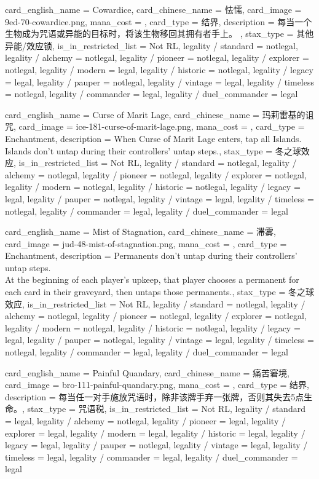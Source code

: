 \documentclass[lang = cn, color = black, 10pt]{AllThatStax}
\begin{document}
\card
{
	card_english_name = {Cowardice},
	card_chinese_name = {怯懦},
	card_image = 9ed-70-cowardice.png,
	mana_cost = ,
	card_type = 结界,
	description = {每当一个生物成为咒语或异能的目标时，将该生物移回其拥有者手上。 },
	stax_type = 其他异能/效应锁,
	is_in_restricted_list = Not RL,
	legality / standard = notlegal,
	legality / alchemy = notlegal,
	legality / pioneer = notlegal,
	legality / explorer = notlegal,
	legality / modern = legal,
	legality / historic = notlegal,
	legality / legacy = legal,
	legality / pauper = notlegal,
	legality / vintage = legal,
	legality / timeless = notlegal,
	legality / commander = legal,
	legality / duel_commander = legal
}

\card
{
	card_english_name = {Curse of Marit Lage},
	card_chinese_name = {玛莉雷基的诅咒},
	card_image = ice-181-curse-of-marit-lage.png,
	mana_cost = ,
	card_type = Enchantment,
	description = {When Curse of Marit Lage enters, tap all Islands.\\
		Islands don't untap during their controllers' untap steps.},
	stax_type = 冬之球效应,
	is_in_restricted_list = Not RL,
	legality / standard = notlegal,
	legality / alchemy = notlegal,
	legality / pioneer = notlegal,
	legality / explorer = notlegal,
	legality / modern = notlegal,
	legality / historic = notlegal,
	legality / legacy = legal,
	legality / pauper = notlegal,
	legality / vintage = legal,
	legality / timeless = notlegal,
	legality / commander = legal,
	legality / duel_commander = legal
}

\card
{
	card_english_name = {Mist of Stagnation},
	card_chinese_name = {滞雾},
	card_image = jud-48-mist-of-stagnation.png,
	mana_cost = ,
	card_type = Enchantment,
	description = {Permanents don't untap during their controllers' untap steps.\\
		At the beginning of each player's upkeep, that player chooses a permanent for each card in their graveyard, then untaps those permanents.},
	stax_type = 冬之球效应,
	is_in_restricted_list = Not RL,
	legality / standard = notlegal,
	legality / alchemy = notlegal,
	legality / pioneer = notlegal,
	legality / explorer = notlegal,
	legality / modern = notlegal,
	legality / historic = notlegal,
	legality / legacy = legal,
	legality / pauper = notlegal,
	legality / vintage = legal,
	legality / timeless = notlegal,
	legality / commander = legal,
	legality / duel_commander = legal
}

\card
{
	card_english_name = {Painful Quandary},
	card_chinese_name = {痛苦窘境},
	card_image = bro-111-painful-quandary.png,
	mana_cost = ,
	card_type = 结界,
	description = {每当任一对手施放咒语时，除非该牌手弃一张牌，否则其失去5点生命。},
	stax_type = 咒语税,
	is_in_restricted_list = Not RL,
	legality / standard = legal,
	legality / alchemy = notlegal,
	legality / pioneer = legal,
	legality / explorer = legal,
	legality / modern = legal,
	legality / historic = legal,
	legality / legacy = legal,
	legality / pauper = notlegal,
	legality / vintage = legal,
	legality / timeless = legal,
	legality / commander = legal,
	legality / duel_commander = legal
}
\end{document}
